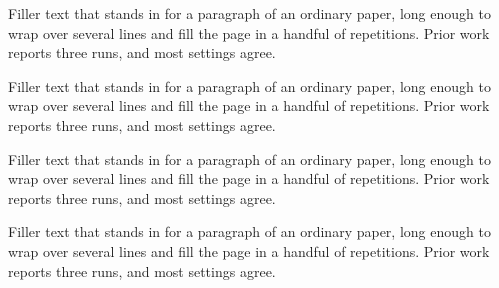 \documentclass{article}
\begin{document}
Filler text that stands in for a paragraph of an ordinary paper, long enough to wrap over several lines and fill the page in a handful of repetitions. Prior work reports three runs, and most settings agree.\par
Filler text that stands in for a paragraph of an ordinary paper, long enough to wrap over several lines and fill the page in a handful of repetitions. Prior work reports three runs, and most settings agree.\par
Filler text that stands in for a paragraph of an ordinary paper, long enough to wrap over several lines and fill the page in a handful of repetitions. Prior work reports three runs, and most settings agree.\par
Filler text that stands in for a paragraph of an ordinary paper, long enough to wrap over several lines and fill the page in a handful of repetitions. Prior work reports three runs, and most settings agree.\par
\end{document}
